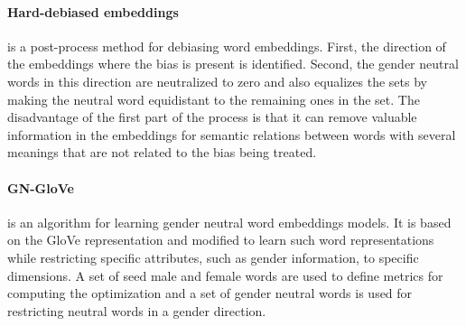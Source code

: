 \documentclass[11pt,a4paper]{article}
\begin{document}
\paragraph{Hard-debiased embeddings} 
\cite{bolukbasi2016} is a post-process method for debiasing word embeddings.
First, the direction of the embeddings where the bias is present is identified. 
Second, the gender neutral words in this direction are neutralized to zero and also equalizes the sets  by making the neutral word equidistant to the remaining ones in the set.
The disadvantage of the first part of the process is that it can remove valuable information in the embeddings for semantic relations between words with several meanings that are not related to the bias being treated.






\paragraph{GN-GloVe} \cite{DBLP:conf/emnlp/ZhaoZLWC18} is an algorithm for learning gender neutral word embeddings models. It is based on the GloVe representation \cite{pennington2014} and modified to learn such word representations while restricting specific attributes, such as gender information, to specific dimensions.
A set of seed male and female words are used to define metrics for computing the optimization and a set of gender neutral words is used for restricting neutral words in a gender direction.
\end{document}
